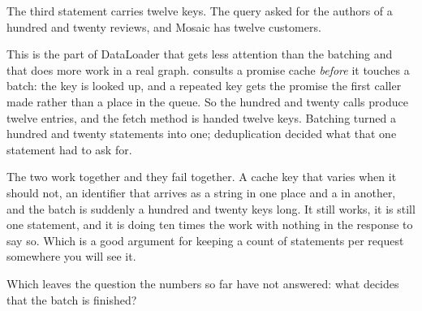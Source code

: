 %
The third statement carries twelve keys. The query asked for the authors of a
hundred and twenty reviews, and Mosaic has twelve customers.

This is the part of DataLoader that gets less attention than the batching and
that does more work in a real graph.  consults a promise cache
\emph{before} it touches a batch: the key is looked up, and a repeated key gets
the promise the first caller made rather than a place in the queue. So the
hundred and twenty calls produce twelve entries, and the fetch method is handed
twelve keys. Batching turned a hundred and twenty statements into one;
deduplication decided what that one statement had to ask for.

The two work together and they fail together. A cache key that varies when it
should not, an identifier that arrives as a string in one place and a
 in another, and the batch is suddenly a hundred and twenty keys
long. It still works, it is still one statement, and it is doing ten times the
work with nothing in the response to say so. Which is a good argument for
keeping a count of statements per request somewhere you will see it.

Which leaves the question the numbers so far have not answered: what decides
that the batch is finished?
